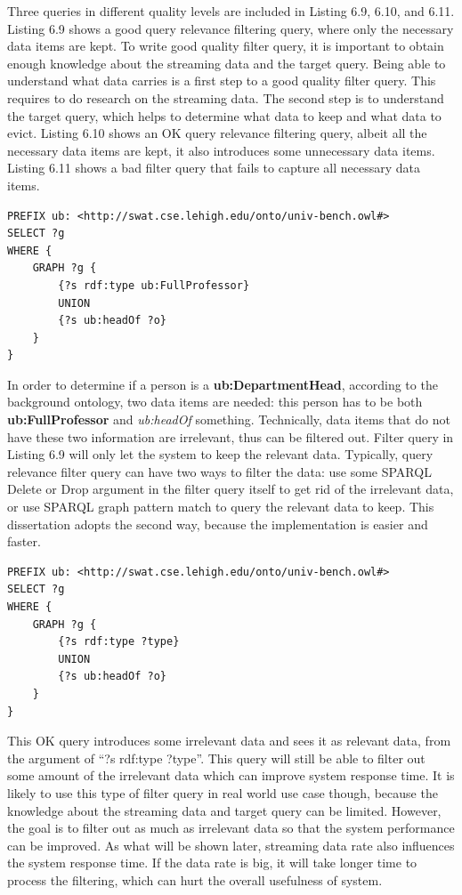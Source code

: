 Three queries in different quality levels are included in Listing 6.9, 6.10, and 6.11.
Listing 6.9 shows a good query relevance filtering query, where only the necessary data items are kept.
To write good quality filter query, it is important to obtain enough knowledge about the streaming data and the target query. 
Being able to understand what data carries is a first step to a good quality filter query.
This requires to do research on the streaming data. 
The second step is to understand the target query, which helps to determine what data to keep and what data to evict. 
Listing 6.10 shows an OK query relevance filtering query, albeit all the necessary data items are kept, it also introduces some unnecessary data items.
Listing 6.11 shows a bad filter query that fails to capture all necessary data items.

\begin{lstlisting}[language=SPARQL,caption={Good Query Relevance Filtering Query},basicstyle=\small,frame=single]
PREFIX ub: <http://swat.cse.lehigh.edu/onto/univ-bench.owl#>
SELECT ?g
WHERE {
    GRAPH ?g {
        {?s rdf:type ub:FullProfessor}
        UNION
    	{?s ub:headOf ?o}  
    }
}
\end{lstlisting}

In order to determine if a person is a \textbf{ub:DepartmentHead}, according to the background ontology, two data items are needed: this person has to be both \textbf{ub:FullProfessor} and \textit{ub:headOf} something.
Technically, data items that do not have these two information are irrelevant, thus can be filtered out. 
Filter query in Listing 6.9 will only let the system to keep the relevant data.
Typically, query relevance filter query can have two ways to filter the data: use some SPARQL Delete or Drop argument in the filter query itself to get rid of the irrelevant data, or use SPARQL graph pattern match to query the relevant data to keep. 
This dissertation adopts the second way, because the implementation is easier and faster.

\begin{lstlisting}[language=SPARQL,caption={OK Query Relevance Filtering Query},basicstyle=\small,frame=single]
PREFIX ub: <http://swat.cse.lehigh.edu/onto/univ-bench.owl#>
SELECT ?g
WHERE { 
    GRAPH ?g {
        {?s rdf:type ?type}
        UNION 
        {?s ub:headOf ?o}  
    }
}
\end{lstlisting}

This OK query introduces some irrelevant data and sees it as relevant data, from the argument of ``?s rdf:type ?type''.
This query will still be able to filter out some amount of the irrelevant data which can improve system response time.
It is likely to use this type of filter query in real world use case though, because the knowledge about the streaming data and target query can be limited. 
However, the goal is to filter out as much as irrelevant data so that the system performance can be improved.
As what will be shown later, streaming data rate also influences the system response time. 
If the data rate is big, it will take longer time to process the filtering, which can hurt the overall usefulness of system.

